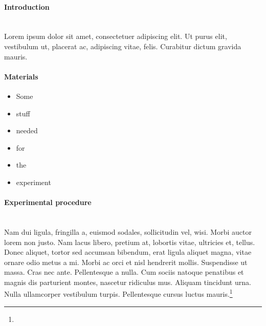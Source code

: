 
\paragraph{Introduction}~\\
Lorem ipsum dolor sit amet, consectetuer adipiscing elit. Ut purus elit, vestibulum ut, placerat ac, adipiscing
vitae, felis. Curabitur dictum gravida mauris.

\paragraph{Materials}
\begin{itemize}
\item Some
\item stuff 
\item needed 
\item for 
\item the 
\item experiment
\end{itemize}

\paragraph{Experimental procedure}~\\
Nam dui ligula, fringilla a, euismod sodales, sollicitudin vel, wisi. Morbi auctor lorem non justo. Nam lacus libero, pretium at, lobortis vitae, ultricies et, tellus. Donec aliquet, tortor sed accumsan bibendum, erat ligula aliquet magna, vitae ornare odio metus a mi. Morbi ac orci et nisl hendrerit mollis. Suspendisse ut massa. Cras nec ante. Pellentesque a nulla. Cum sociis natoque penatibus et magnis dis parturient montes, nascetur ridiculus mus. Aliquam tincidunt urna. Nulla ullamcorper vestibulum turpis. Pellentesque cursus luctus mauris.\footnote{\lipsum[14]}

